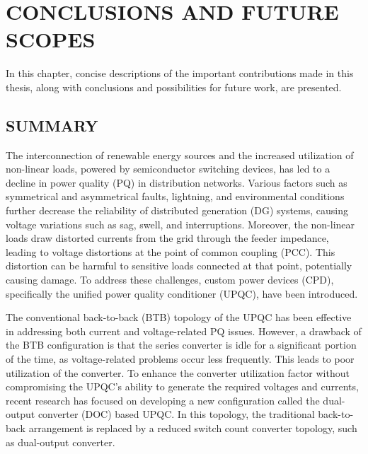 \chapter{CONCLUSIONS AND FUTURE SCOPES}
\label{7.Chap:Conclusions}
In this chapter, concise descriptions of the important contributions made in this thesis, along with conclusions and possibilities for future work, are presented.

\section{SUMMARY}
The interconnection of renewable energy sources and the increased utilization of non-linear loads, powered by semiconductor switching devices, has led to a decline in power quality (PQ) in distribution networks. Various factors such as symmetrical and asymmetrical faults, lightning, and environmental conditions further decrease the reliability of distributed generation (DG) systems, causing voltage variations such as sag, swell, and interruptions. Moreover, the non-linear loads draw distorted currents from the grid through the feeder impedance, leading to voltage distortions at the point of common coupling (PCC). This distortion can be harmful to sensitive loads connected at that point, potentially causing damage. To address these challenges, custom power devices (CPD), specifically the unified power quality conditioner (UPQC), have been introduced.

The conventional back-to-back (BTB) topology of the UPQC has been effective in addressing both current and voltage-related PQ issues. However, a drawback of the BTB configuration is that the series converter is idle for a significant portion of the time, as voltage-related problems occur less frequently. This leads to poor utilization of the converter. To enhance the converter utilization factor without compromising the UPQC's ability to generate the required voltages and currents, recent research has focused on developing a new configuration called the dual-output converter (DOC) based UPQC. In this topology, the traditional back-to-back arrangement is replaced by a reduced switch count converter topology, such as dual-output converter.

